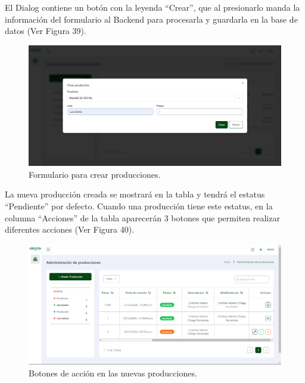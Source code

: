 El Dialog contiene un botón con la leyenda ``Crear'', que al presionarlo manda la información del formulario al Backend para procesarla y guardarla en la base de datos (Ver Figura 39).

    \begin{figure}[H]
        \begin{center}
            \includegraphics[scale=0.33]{img/actividades/producciones/formulario-producciones.png}
            \caption{Formulario para crear producciones.}
            \label{fig:formulario-producciones}
        \end{center}
    \end{figure}

La nueva producción creada se mostrará en la tabla y tendrá el estatus ``Pendiente'' por defecto. Cuando una producción tiene este estatus, en la columna ``Acciones'' de la tabla aparecerán 3 botones que permiten realizar diferentes acciones (Ver Figura 40). 

    \begin{figure}[H]
        \begin{center}
            \includegraphics[scale=0.33]{img/actividades/producciones/botones-accion.png}
            \caption{Botones de acción en las nuevas producciones.}
            \label{fig:botones-accion}
        \end{center}
    \end{figure}

